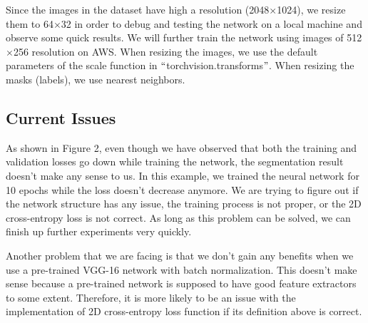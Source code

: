 \documentclass[10pt,twocolumn,letterpaper]{article}
\begin{document}
Since the images in the dataset have high a resolution (2048$\times$1024), we resize them to 64$\times$32 in order to debug and testing the network on a local machine and observe some quick results. We will further train the network using images of 512$\times$256 resolution on AWS. When resizing the images, we use the default parameters of the scale function in $``$torchvision.transforms$"$. When resizing the masks (labels), we use nearest neighbors.

\subsection{Current Issues}
As shown in Figure 2, even though we have observed that both the training and validation losses go down while training the network, the segmentation result doesn't make any sense to us. In this example, we trained the neural network for 10 epochs while the loss doesn't decrease anymore. We are trying to figure out if the network structure has any issue, the training process is not proper, or the 2D cross-entropy loss is not correct. As long as this problem can be solved, we can finish up further experiments very quickly.

Another problem that we are facing is that we don't gain any benefits when we use a pre-trained VGG-16 network with batch normalization. This doesn't make sense because a pre-trained network is supposed to have good feature extractors to some extent. Therefore, it is more likely to be an issue with the implementation of 2D cross-entropy loss function if its definition above is correct.

{\small


}
\end{document}
